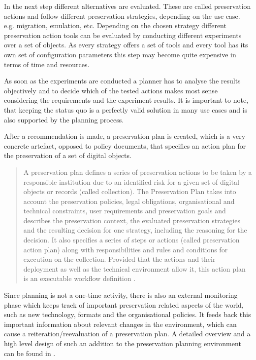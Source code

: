 In the next step different alternatives are evaluated. These are called preservation actions and follow different preservation strategies, depending on the use case. e.g. migration, emulation, etc. Depending on the chosen
strategy different preservation action tools can be evaluated by conducting different experiments over a set of objects. As every strategy offers a set of tools and every tool has its own set of configuration parameters this step may become quite expensive in terms of time and resources.

As soon as the experiments are conducted a planner has to analyse the results objectively and to decide which of the tested actions makes most sense considering the requirements and the experiment results. It is important to note, that
keeping the status quo is a perfectly valid solution in many use cases and is also supported by the planning process.

After a recommendation is made, a preservation plan is created, which is a very concrete artefact, opposed to policy documents, that specifies an action plan for the preservation of a set of digital objects.

\begin{quote}
A preservation plan defines a series of preservation actions to be taken by a responsible institution due to an identified risk for a given set of digital objects or records (called collection). The Preservation Plan takes into account the preservation policies, legal obligations, organisational and technical constraints, user requirements and preservation goals and describes the preservation context, the evaluated preservation strategies and the resulting decision for one strategy, including the reasoning for the decision. It also specifies a series of steps or actions (called preservation action plan) along with responsibilities and rules and conditions for execution on the collection. Provided that the actions and their deployment as well as the technical environment allow it, this action plan is an executable workflow definition \cite{Becker:2009fk}.
\end{quote}

Since planning is not a one-time activity, there is also an external monitoring phase which keeps track of important preservation related aspects of the world, such as new technology, formats and the organisational policies. It feeds back this important information about relevant changes in the environment, which can cause a reiteration/reevaluation of a preservation plan. A detailed overview and a high level design of such an addition to the preservation planning environment can be found in \cite{duretec:2012:watch}.

